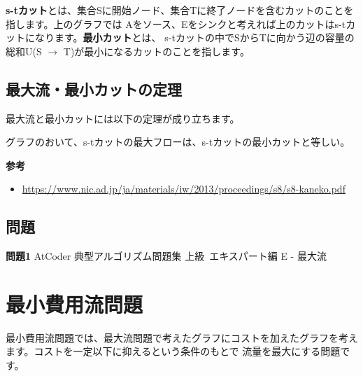 \documentclass{jlreq}
\begin{document}
\vspace{0.5cm}

\textbf{s-tカット}とは、集合Sに開始ノード、集合Tに終了ノードを含むカットのことを指します。上のグラフでは
Aをソース、Eをシンクと考えれば上のカットはs-tカットになります。\textbf{最小カット}とは、
s-tカットの中でSからTに向かう辺の容量の総和U(S $\rightarrow$ T)が最小になるカットのことを指します。

\subsection{最大流・最小カットの定理}
最大流と最小カットには以下の定理が成り立ちます。

\begin{theorembox}
  グラフのおいて、s-tカットの最大フローは、s-tカットの最小カットと等しい。
\end{theorembox}



\textbf{参考}

\begin{itemize}
  \item \url{https://www.nic.ad.jp/ja/materials/iw/2013/proceedings/s8/s8-kaneko.pdf}
\end{itemize}

\subsection{問題}
\textbf{問題1} AtCoder 典型アルゴリズム問題集 上級~エキスパート編 E - 最大流

\newpage

\section{最小費用流問題}
最小費用流問題では、最大流問題で考えたグラフにコストを加えたグラフを考えます。コストを一定以下に抑えるという条件のもとで
流量を最大にする問題です。

\vspace{0.5cm}

\begin{center}
\end{center}
\end{document}
